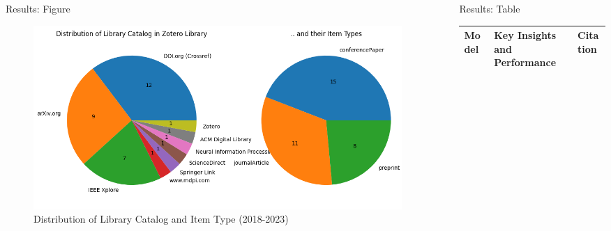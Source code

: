 \documentclass{beamer} %
\begin{document}
\begin{frame}[t]
\begin{columns}[t]
\begin{column}{0.3\textwidth}
			\begin{block}{Results: Figure}
				\setcounter{figure}{0}
				\begin{minipage}{\linewidth}
					\begin{figure}
						\includegraphics[width=\linewidth]{Figure_1.png}
						\caption{Distribution of Library Catalog and Item Type (2018-2023)}
					\end{figure}
				\end{minipage}
			\end{block}



		\end{column} %

		\begin{column}{0.005\textwidth}\end{column} %

		\begin{column}{0.3\textwidth}



			\begin{block}{Results: Table}
				\begin{footnotesize}
					\begin{table}[H]
						\begin{tabular}{p{} p{} p{}}
							\toprule
							Model                         & Key Insights and Performance                                                                                   & Citation                                           \\
							\midrule


\end{tabular}
\end{table}
\end{footnotesize}
\end{block}
\end{column}
\end{columns}
\end{frame}
\end{document}
